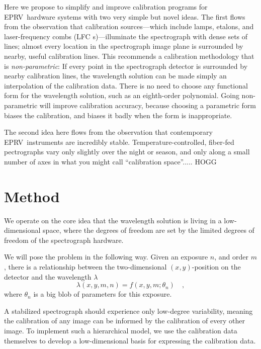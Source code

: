 \documentclass[12pt, letterpaper]{article}
\newcommand{\acronym}[1]{{\small{#1}}}
\newcommand{\eprv}{\acronym{EPRV}}
\newcommand{\lfc}{\acronym{LFC}}
\begin{document}
Here we propose to simplify and improve calibration programs for
\eprv\ hardware systems with two very simple but novel ideas.
The first flows from the observation that calibration sources---which
include lamps, etalons, and laser-frequency combs (\lfc
s)---illuminate the spectrograph with dense sets of lines; almost every
location in the spectrograph image plane is surrounded by nearby,
useful calibration lines.
This recommends a calibration methodology that is
\emph{non-parametric}:
If every point in the spectrograph detector is surrounded by nearby
calibration lines, the wavelength solution can be made simply an
interpolation of the calibration data.
There is no need to choose any functional form for the wavelength
solution, such as an eighth-order polynomial.
Going non-parametric will improve calibration accuracy, because
choosing a parametric form biases the calibration, and biases it
badly when the form is inappropriate.

The second idea here flows from the observation that contemporary
\eprv\ instruments are incredibly stable.
Temperature-controlled, fiber-fed pectrographs vary only slightly over
the night or season, and only along a small number of axes in what you
might call ``calibration space''..... HOGG

\section{Method} \label{sec:method}
We operate on the core idea that the wavelength solution is living in a low-dimensional space, where the degrees of freedom are set by the limited degrees of freedom of the spectrograph hardware.

We will pose the problem in the following way.  Given an exposure $n$, and order $m$, there is a relationship between
the two-dimensional $(x,y)$-position on the detector and the
wavelength $\lambda$
\begin{equation}
\lambda(x,y,m,n) = f(x,y,m;\theta_{n})
\quad ,
\end{equation}
where $\theta_{n}$ is a big blob of parameters for this exposure.

A stabilized spectrograph should experience only low-degree variability, meaning the calibration of any image can be informed by the calibration of every other image.  To implement such a hierarchical model, we use the calibration data themselves to develop a low-dimensional basis for expressing the calibration data.
\end{document}
